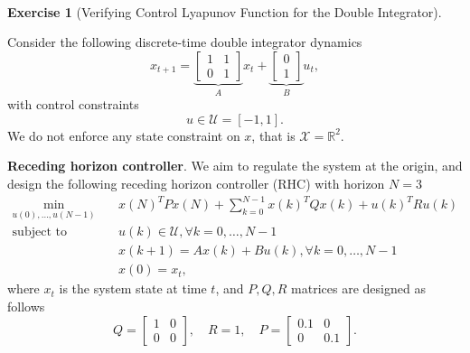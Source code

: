 \documentclass[
]{book}
\theoremstyle{definition}
\theoremstyle{definition}
\theoremstyle{definition}
\newtheorem{exercise}{Exercise}[chapter]
\theoremstyle{definition}
\theoremstyle{remark}
\begin{document}
~

\begin{exercise}[Verifying Control Lyapunov Function for the  Double Integrator]
\protect\hypertarget{exr:double-integrator-mpc}{}\label{exr:double-integrator-mpc}

Consider the following discrete-time double integrator dynamics
\[
x_{t+1} = \underbrace{\begin{bmatrix} 1 & 1 \\ 0 & 1 \end{bmatrix}}_{A} x_t + \underbrace{\begin{bmatrix} 0 \\ 1 \end{bmatrix}}_{B} u_t, 
\]
with control constraints
\[
u \in \mathcal{U} = [-1, 1].
\]
We do not enforce any state constraint on \(x\), that is \(\mathcal{X} = \mathbb{R}^2\).

\textbf{Receding horizon controller}. We aim to regulate the system at the origin, and design the following receding horizon controller (RHC) with horizon \(N=3\)
\begin{equation}
\begin{split}
\min_{u(0),\dots,u(N-1)} & \quad x(N)^T P x(N) + \sum_{k=0}^{N-1} x(k)^T Q x(k) + u(k)^T R u(k) \\
\text{subject to} & \quad u(k) \in \mathcal{U}, \forall k=0,\dots,N-1 \\
& \quad x(k+1) = A x(k) + B u(k), \forall k = 0,\dots,N-1 \\
& \quad x(0) = x_t,
\end{split}
\label{eq:double-integrator-rhc-exercise}
\end{equation}
where \(x_t\) is the system state at time \(t\), and \(P,Q,R\) matrices are designed as follows
\[
Q = \begin{bmatrix} 1 & 0 \\ 0 & 0 \end{bmatrix}, \quad R = 1, \quad P = \begin{bmatrix} 0.1 & 0 \\ 0 & 0.1 \end{bmatrix}.
\]


\end{exercise}
\end{document}

